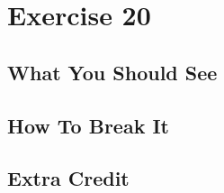 \chapter{Exercise 20}


\section{What You Should See}


\section{How To Break It}


\section{Extra Credit}




